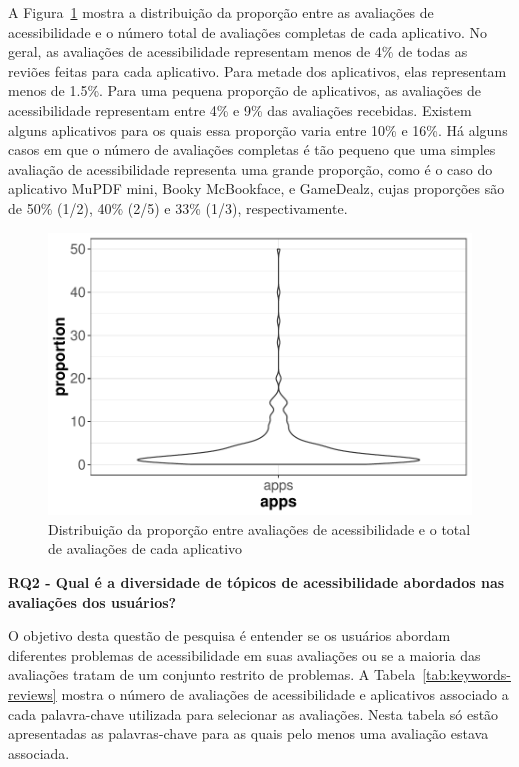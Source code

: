 A Figura~\ref{fig:distribution-proportion} mostra a distribuição da proporção entre as avaliações de acessibilidade e o número total de avaliações completas de cada aplicativo.
No geral, as avaliações de acessibilidade representam menos de 4\% de todas as reviões feitas para cada aplicativo. Para metade dos aplicativos, elas representam menos de 1.5\%.
Para uma pequena proporção de aplicativos, as avaliações de acessibilidade representam entre 4\% e 9\% das avaliações recebidas. Existem alguns aplicativos para os quais essa proporção varia entre 10\% e 16\%.
Há alguns casos em que o número de avaliações completas é tão pequeno que uma simples avaliação de acessibilidade representa uma grande proporção, como é o caso do aplicativo MuPDF mini, Booky McBookface, e GameDealz, cujas proporções são de 50\% (1/2), 40\% (2/5) e 33\% (1/3), respectivamente. 
\newline 

 \begin{figure}[!htb]
 \centering
\includegraphics[scale=0.8]{imagens/distribution-proportion-accreviews}
\caption{Distribuição da proporção entre avaliações de acessibilidade e o total de avaliações de cada aplicativo}
\label{fig:distribution-proportion}
\end{figure}


\textbf{RQ2 - Qual é a diversidade de tópicos de acessibilidade abordados nas avaliações dos usuários?}

O objetivo desta questão de pesquisa é entender se os usuários abordam diferentes problemas de acessibilidade em suas avaliações ou se a maioria das avaliações tratam de um conjunto restrito de problemas. 
A Tabela~\ref{tab:keywords-reviews} mostra o número de avaliações de acessibilidade e aplicativos associado a cada palavra-chave utilizada para selecionar as avaliações. 
Nesta tabela só estão apresentadas as palavras-chave para as quais pelo menos uma avaliação estava associada. 

